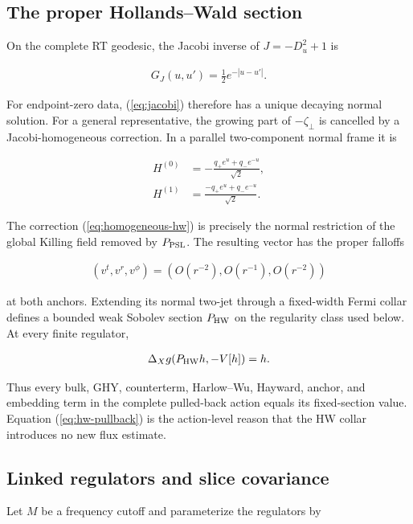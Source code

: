 \subsection{The proper Hollands--Wald section}\label{subsec:hw-section}

On the complete RT geodesic, the Jacobi inverse of $J=-D_u^2+1$ is

\begin{align}
G_J(u,u')=\frac12e^{-|u-u'|}.
\end{align}

For endpoint-zero data, (\ref{eq:jacobi}) therefore has a unique decaying normal solution. For a general representative, the growing part of $-\zeta_\perp$ is cancelled by a Jacobi-homogeneous correction. In a parallel two-component normal frame it is

\begin{align}
H^{(0)}&=-\frac{q_+e^u+q_-e^{-u}}{\sqrt2},\\
H^{(1)}&=\frac{-q_+e^u+q_-e^{-u}}{\sqrt2}. \label{eq:homogeneous-hw}
\end{align}

The correction (\ref{eq:homogeneous-hw}) is precisely the normal restriction of the global Killing field removed by $P_{\rm PSL}$. The resulting vector has the proper falloffs

\begin{align}
(v^t,v^r,v^\phi)
=(O(r^{-2}),O(r^{-1}),O(r^{-2}))
\end{align}

at both anchors. Extending its normal two-jet through a fixed-width Fermi collar defines a bounded weak Sobolev section $P_{\rm HW}$ on the regularity class used below. At every finite regulator,

\begin{align}
\Delta_Xg(P_{\rm HW}h,-V[h])=h. \label{eq:hw-pullback}
\end{align}

Thus every bulk, GHY, counterterm, Harlow--Wu, Hayward, anchor, and embedding term in the complete pulled-back action equals its fixed-section value. Equation (\ref{eq:hw-pullback}) is the action-level reason that the HW collar introduces no new flux estimate.

\subsection{Linked regulators and slice covariance}\label{subsec:slice-covariance}

Let $M$ be a frequency cutoff and parameterize the regulators by

